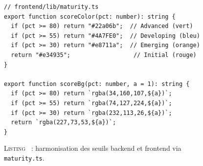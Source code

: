 \documentclass[12pt,a4paper]{report}
\begin{document}
\begin{figure}[H]
\centering
\begin{minipage}{0.85\textwidth}
\begin{verbatim}
// frontend/lib/maturity.ts
export function scoreColor(pct: number): string {
  if (pct >= 80) return "#22a06b";  // Advanced (vert)
  if (pct >= 55) return "#4A7FE0";  // Developing (bleu)
  if (pct >= 30) return "#e8711a";  // Emerging (orange)
  return "#e34935";                  // Initial (rouge)
}

export function scoreBg(pct: number, a = 1): string {
  if (pct >= 80) return `rgba(34,160,107,${a})`;
  if (pct >= 55) return `rgba(74,127,224,${a})`;
  if (pct >= 30) return `rgba(232,113,26,${a})`;
  return `rgba(227,73,53,${a})`;
}
\end{verbatim}
\end{minipage}
\label{lst:scorecolor}
\caption*{\textsc{Listing \thefigure}~: harmonisation des seuils backend et frontend via \texttt{maturity.ts}.}
\end{figure}
\end{document}
